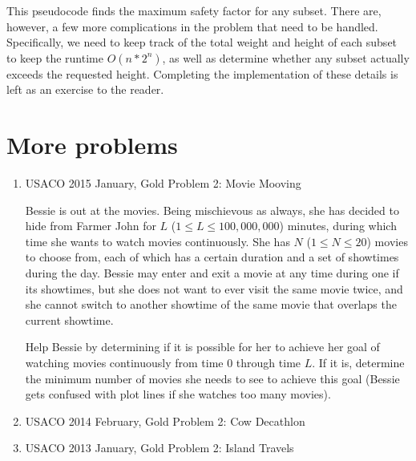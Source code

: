 \documentclass{article}
\begin{document}
This pseudocode finds the maximum safety factor for any subset. There are, however, a few more complications in the problem that need to be handled. Specifically, we need to keep track of the total weight and height of each subset to keep the runtime $O(n*2^n)$, as well as determine whether any subset actually exceeds the requested height. Completing the implementation of these details is left as an exercise to the reader.

\pagebreak

\section{More problems}

\begin{enumerate}
    \item USACO 2015 January, Gold Problem 2: Movie Mooving
    
    Bessie is out at the movies.  Being mischievous as always, she has decided to hide from Farmer John for $L$ ($1 \leq L \leq 100,000,000$) minutes, during which time she wants to watch movies continuously. She has $N$ ($1 \leq N \leq 20$) movies to choose from, each of which has a certain duration and a set of showtimes during the day.  Bessie may enter and exit a movie at any time during one if its showtimes, but she does not want to ever visit the same movie twice, and she cannot switch to another showtime of the same movie that overlaps the current showtime.
    
    Help Bessie by determining if it is possible for her to achieve her goal of watching movies continuously from time $0$ through time $L$.  If it is, determine the minimum number of movies she needs to see to achieve this goal (Bessie gets confused with plot lines if she watches too many movies).

    \item USACO 2014 February, Gold Problem 2: Cow Decathlon
    \item USACO 2013 January, Gold Problem 2: Island Travels
\end{enumerate}
\end{document}

